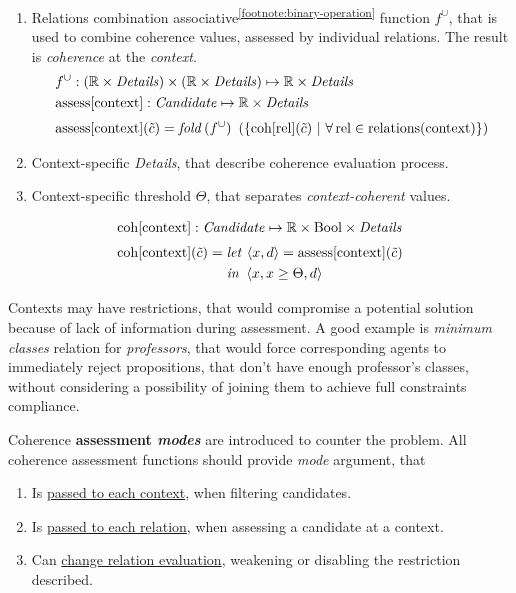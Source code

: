 \documentclass[../header]{subfiles}
\begin{document}
\begin{enumerate}
\begin{itemize}
        \end{itemize}
  \item Relations combination associative\textsuperscript{\ref{footnote:binary-operation}}
        function $f^\cup$, that is used to combine coherence values, assessed by
        individual relations. The result is \emph{coherence} at the \emph{context}.
        \begin{align*}
          & f^\cup: (\mathbb{R} \times \mathit{Details}) \times
                    (\mathbb{R} \times \mathit{Details})
             \mapsto \mathbb{R} \times \mathit{Details} \\
          & \mathrm{assess}[\mathrm{context}]: \mathit{Candidate} \mapsto
                                               \mathbb{R} \times \mathit{Details}
          \\[0.3em]
          & \mathrm{assess}[\mathrm{context}](\tilde{c}) =
            \mathit{fold}\, (f^\cup) ~ \left(
            \lbrace \mathrm{coh}[\mathrm{rel}](\tilde{c}) ~|~
                    \forall\, \mathrm{rel} \in \mathrm{relations}(\mathrm{context})
            \rbrace\right)
        \end{align*}

  \item Context-specific \emph{Details}, that describe coherence evaluation process.
  \item Context-specific threshold $\Theta$, that separates \emph{context-coherent} values.
\end{enumerate}

\begin{align*}
  & \mathrm{coh}[\mathrm{context}]: \mathit{Candidate} \mapsto \mathbb{R} \times
                            \mathrm{Bool} \times \mathit{Details}
  \\[0.3em]
  & \mathrm{coh}[\mathrm{context}](\tilde{c}) =
      \begin{aligned}[t] & \mathit{let}\,  \left<x,d\right> = \mathrm{assess}[\mathrm{context}](\tilde{c})  \\& \mathit{in}~ \left<x, x \geq \Theta, d\right> \end{aligned}
\end{align*}


\medskip
\noindent
Contexts may have restrictions, that would compromise a potential solution
because of lack of information during assessment. A good example is
\emph{minimum classes} relation for \emph{professors}, that would force
corresponding agents to immediately reject propositions, that don't have enough
professor's classes, without considering a possibility of joining them to achieve
full constraints compliance.

Coherence \textbf{assessment \emph{modes}} are introduced to counter the problem.
All coherence assessment functions should provide \emph{mode} argument, that
\begin{enumerate}
  \item Is \underline{passed to each context}, when filtering candidates.
  \item Is \underline{passed to each relation}, when assessing a candidate at a context.
  \item Can \underline{change relation evaluation}, weakening or disabling the
        restriction described.
\end{enumerate}
\end{document}
